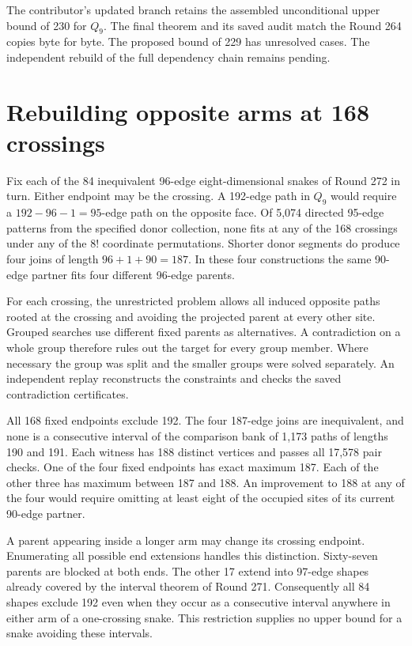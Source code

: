 \documentclass[11pt,a4paper]{article}
\theoremstyle{definition}
\theoremstyle{remark}
\begin{document}
The contributor's updated branch retains the assembled unconditional upper bound of 230 for \(Q_9\). The final theorem and its saved audit match the Round 264 copies byte for byte. The proposed bound of 229 has unresolved cases. The independent rebuild of the full dependency chain remains pending.

\section{Rebuilding opposite arms at 168 crossings}
Fix each of the 84 inequivalent 96-edge eight-dimensional snakes of Round 272 in turn. Either endpoint may be the crossing. A 192-edge path in \(Q_9\) would require a \(192-96-1=95\)-edge path on the opposite face. Of 5,074 directed 95-edge patterns from the specified donor collection, none fits at any of the 168 crossings under any of the \(8!\) coordinate permutations. Shorter donor segments do produce four joins of length \(96+1+90=187\). In these four constructions the same 90-edge partner fits four different 96-edge parents.

For each crossing, the unrestricted problem allows all induced opposite paths rooted at the crossing and avoiding the projected parent at every other site. Grouped searches use different fixed parents as alternatives. A contradiction on a whole group therefore rules out the target for every group member. Where necessary the group was split and the smaller groups were solved separately. An independent replay reconstructs the constraints and checks the saved contradiction certificates.

All 168 fixed endpoints exclude 192. The four 187-edge joins are inequivalent, and none is a consecutive interval of the comparison bank of 1,173 paths of lengths 190 and 191. Each witness has 188 distinct vertices and passes all 17,578 pair checks. One of the four fixed endpoints has exact maximum 187. Each of the other three has maximum between 187 and 188. An improvement to 188 at any of the four would require omitting at least eight of the occupied sites of its current 90-edge partner.

A parent appearing inside a longer arm may change its crossing endpoint. Enumerating all possible end extensions handles this distinction. Sixty-seven parents are blocked at both ends. The other 17 extend into 97-edge shapes already covered by the interval theorem of Round 271. Consequently all 84 shapes exclude 192 even when they occur as a consecutive interval anywhere in either arm of a one-crossing snake. This restriction supplies no upper bound for a snake avoiding these intervals.
\end{document}
